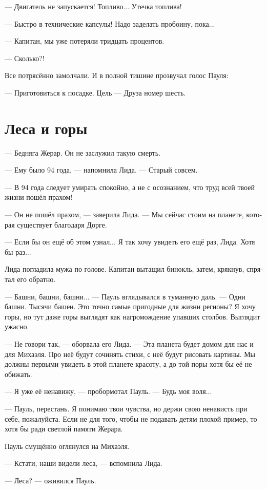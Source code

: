 \documentclass[a4paper,10pt,fleqn]{book}\usepackage{polyglossia}\setdefaultlanguage[babelshorthands=true]{russian}\setotherlanguage{english}\defaultfontfeatures{Ligatures=TeX,Mapping=tex-text}\usepackage{xcolor}\newcommand{\ml}[3]{#2}
\begin{document}
--- Двигатель не запускается!
Топливо...
Утечка топлива!

--- Быстро в технические капсулы!
Надо заделать пробоину, пока...

--- Капитан, мы уже потеряли тридцать процентов.

--- Сколько?!

Все потрясённо замолчали.
И в полной тишине прозвучал голос Пауля:

--- Приготовиться к посадке.
Цель --- Друза номер шесть.

\section{Леса и горы}

--- Бедняга Жерар.
Он не заслужил такую смерть.

--- Ему было 94 года, --- напомнила Лида.
--- Старый совсем.

--- В 94 года следует умирать спокойно, а не с осознанием, что труд всей твоей жизни пошёл прахом!

--- Он не пошёл прахом, --- заверила Лида.
--- Мы сейчас стоим на планете, которая существует благодаря Дорге.

--- Если бы он ещё об этом узнал...
Я так хочу увидеть его ещё раз, Лида.
Хотя бы раз...

Лида погладила мужа по голове.
Капитан вытащил бинокль, затем, крякнув, спрятал его обратно.

--- Башни, башни, башни... --- Пауль вглядывался в туманную даль.
--- Одни башни.
Тысячи башен.
Это точно самые пригодные для жизни регионы?
Я хочу горы, но тут даже горы выглядят как нагромождение упавших столбов.
Выглядит ужасно.

--- Не говори так, --- оборвала его Лида.
--- Эта планета будет домом для нас и для Михаэля.
Про неё будут сочинять стихи, с неё будут рисовать картины.
Мы должны первыми увидеть в этой планете красоту, а до той поры хотя бы её не обижать.

--- Я уже её ненавижу, --- пробормотал Пауль.
--- Будь моя воля...

--- Пауль, перестань.
Я понимаю твои чувства, но держи свою ненависть при себе, пожалуйста.
Если не для того, чтобы не подавать детям плохой пример, то хотя бы ради светлой памяти Жерара.

Пауль смущённо оглянулся на Михаэля.

--- Кстати, наши видели леса, --- вспомнила Лида.

--- Леса? --- оживился Пауль.
\end{document}
